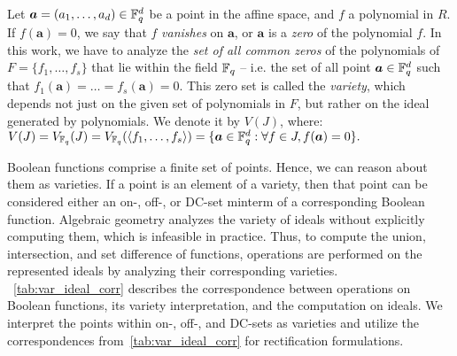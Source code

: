 Let $\bm{a} = (a_1,\dots,a_d) \in {\mathbb{F}}_{q}^d$ be a point in the affine
space, and $f$ a polynomial in $R$. If $f(\bm{a}) = 0$, we say
that $f$ {\it vanishes} on $\bm{a}$, or $\bm{a}$ is a {\it zero} of the polynomial $f$.
 In this work, we have to analyze
the {\it set of all common zeros} of the polynomials of $F = 
\{f_1,\dots,f_s\}$  that lie within the field ${\mathbb{F}}_{q}$ -- i.e. the set of
all point $\bm{a} \in {\mathbb{F}}_{q}^d$ such that
$f_1(\bm{a})=\dots=f_s(\bm{a})=0$. This zero set is called the {\it 
  variety}, which depends not just on the given set of polynomials in
$F$, but rather on the ideal generated by polynomials. We denote it by
$V(J)$, where: $ V(J)= V_{{\mathbb{F}}_{q}}(J) = V_{{\mathbb{F}}_{q}}(\langle f_1,\dots,f_s \rangle) = \{\bm{a} 
\in {\mathbb{F}}_{q}^d: \forall f \in J, f(\bm{a}) = 0\}.$

Boolean functions comprise a finite set of points. Hence, we can reason about them as varieties. If a point is an element of a variety, then that point can be considered either an on-, off-, or DC-set minterm of a corresponding Boolean function. 
Algebraic geometry analyzes the variety of ideals without explicitly computing them, which is infeasible in practice.
Thus, to compute the union, intersection, and set difference of functions, operations are performed on the represented ideals by analyzing their corresponding varieties.
~\autoref{tab:var_ideal_corr} describes the correspondence between operations on Boolean functions, its variety interpretation, and the computation on ideals. We interpret the points within on-, off-, and DC-sets as varieties and utilize the correspondences from~\autoref{tab:var_ideal_corr} for rectification formulations. 

